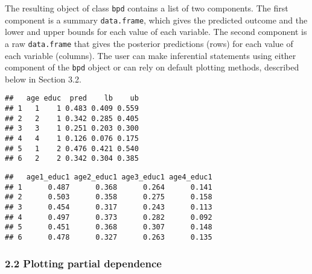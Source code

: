 \documentclass[]{article}
\newenvironment{Shaded}{\begin{snugshade}}{\end{snugshade}}
\newcommand{\KeywordTok}[1]{\textcolor[rgb]{0.13,0.29,0.53}{\textbf{#1}}}
\newcommand{\DecValTok}[1]{\textcolor[rgb]{0.00,0.00,0.81}{#1}}
\newcommand{\StringTok}[1]{\textcolor[rgb]{0.31,0.60,0.02}{#1}}
\newcommand{\OperatorTok}[1]{\textcolor[rgb]{0.81,0.36,0.00}{\textbf{#1}}}
\newcommand{\NormalTok}[1]{#1}
\begin{document}
The resulting object of class \texttt{bpd} contains a list of two
components. The first component is a summary \texttt{data.frame}, which
gives the predicted outcome and the lower and upper bounds for each
value of each variable. The second component is a raw
\texttt{data.frame} that gives the posterior predictions (rows) for each
value of each variable (columns). The user can make inferential
statements using either component of the \texttt{bpd} object or can rely
on default plotting methods, described below in Section 3.2.

\begin{Shaded}
\end{Shaded}

\begin{verbatim}
##   age educ  pred    lb    ub
## 1   1    1 0.483 0.409 0.559
## 2   2    1 0.342 0.285 0.405
## 3   3    1 0.251 0.203 0.300
## 4   4    1 0.126 0.076 0.175
## 5   1    2 0.476 0.421 0.540
## 6   2    2 0.342 0.304 0.385
\end{verbatim}

\begin{Shaded}
\end{Shaded}

\begin{verbatim}
##   age1_educ1 age2_educ1 age3_educ1 age4_educ1
## 1      0.487      0.368      0.264      0.141
## 2      0.503      0.358      0.275      0.158
## 3      0.454      0.317      0.243      0.113
## 4      0.497      0.373      0.282      0.092
## 5      0.451      0.368      0.307      0.148
## 6      0.478      0.327      0.263      0.135
\end{verbatim}

\subsubsection{2.2 Plotting partial
dependence}\label{plotting-partial-dependence}
\end{document}
